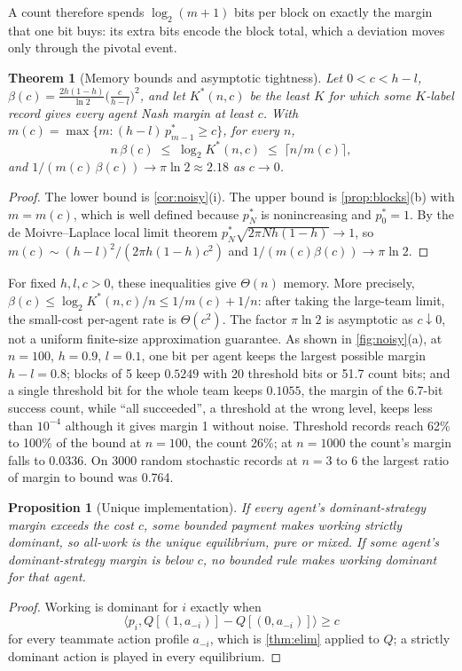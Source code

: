 \documentclass[sigconf,anonymous,acmthm=false]{aamas}
\theoremstyle{acmplain}
\newtheorem{theorem}{Theorem}
\newtheorem{proposition}{Proposition}
\theoremstyle{acmdefinition}
\begin{document}
A count therefore spends $\log_2(m+1)$ bits per block on exactly the margin that one bit buys:
its extra bits encode the block total, which a deviation moves only through the pivotal event.

\begin{theorem}[Memory bounds and asymptotic tightness]\label{thm:tight}
Let $0<c<h-l$, $\beta(c)=\frac{2h(1-h)}{\ln2}\big(\frac c{h-l}\big)^2$, and let $K^*(n,c)$ be
the least $K$ for which some $K$-label record gives every agent Nash margin at least $c$.
With $m(c)=\max\{m:(h-l)\,p^*_{m-1}\ge c\}$, for every $n$,
\[ n\,\beta(c)\;\le\;\log_2K^*(n,c)\;\le\;\lceil n/m(c)\rceil, \]
and $1/(m(c)\,\beta(c))\to\pi\ln2\approx2.18$ as $c\to0$.
\end{theorem}
\begin{proof}
The lower bound is \cref{cor:noisy}(i). The upper bound is \cref{prop:blocks}(b) with
$m=m(c)$, which is well defined because $p^*_N$ is nonincreasing and $p^*_0=1$. By the de
Moivre--Laplace local limit theorem $p^*_N\sqrt{2\pi Nh(1-h)}\to1$, so
$m(c)\sim(h-l)^2/(2\pi h(1-h)c^2)$ and $1/(m(c)\beta(c))\to\pi\ln2$.
\end{proof}

For fixed $h,l,c>0$, these inequalities give $\Theta(n)$ memory. More precisely,
$\beta(c)\le\log_2K^*(n,c)/n\le1/m(c)+1/n$: after taking the large-team
limit, the small-cost per-agent rate is $\Theta(c^2)$. The factor $\pi\ln2$ is
asymptotic as $c\downarrow0$, not a uniform finite-size approximation guarantee. As shown in \cref{fig:noisy}(a), at
$n=100$, $h=0.9$, $l=0.1$, one bit per agent keeps the largest possible margin $h-l=0.8$;
blocks of 5 keep $0.5249$ with 20 threshold bits or 51.7 count bits; and a single threshold
bit for the whole team keeps $0.1055$, the margin of the 6.7-bit success count, while ``all
succeeded'', a threshold at the wrong level, keeps less than $10^{-4}$ although it gives
margin 1 without noise. Threshold records reach 62\% to 100\% of the bound at $n=100$, the
count 26\%; at $n=1000$ the count's margin falls to $0.0336$. On 3000 random stochastic
records at $n=3$ to 6 the largest ratio of margin to bound was 0.764.

\begin{proposition}[Unique implementation]\label{prop:unique}
If every agent's dominant-strategy margin exceeds the cost $c$, some bounded payment makes working
strictly dominant, so all-work is the unique equilibrium, pure or mixed. If some agent's
dominant-strategy margin is below $c$, no bounded rule makes working dominant for that agent.
\end{proposition}
\begin{proof}
Working is dominant for $i$ exactly when
\[ \langle p_i,Q[(1,a_{-i})]-Q[(0,a_{-i})]\rangle\ge c \]
for every teammate action profile $a_{-i}$, which is \cref{thm:elim} applied to $Q$; a strictly dominant action is played in
every equilibrium.
\end{proof}
\end{document}
